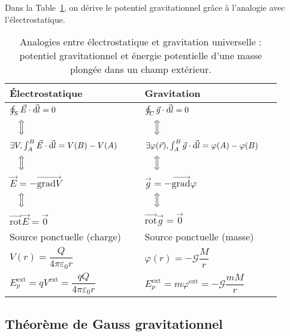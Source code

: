     Dans la Table~\ref{tab:analogie_gravitation_universelle_potentiel_gravitationnel}, on dérive le potentiel gravitationnel grâce à l'analogie avec l'électrostatique.
    \begin{table}
        \centering
        \begin{tabular}{p{0.45\linewidth}|p{0.45\linewidth}}
            \toprule
            Électrostatique & Gravitation \\ \midrule
            $\oint_{S}\vec{E}\cdot\vec{\mathrm{d} l}=0$ & $\oint_{C}\vec{g}\cdot\vec{\mathrm{d} l}=0$\\[0.25cm]
            $\quad\Big\Updownarrow$&$\quad\Big\Updownarrow$\\[0.25cm]
            $\exists V, \int_{A}^{B}\vec{E}\cdot\vec{\mathrm{d} l}=V(B)-V(A)$ & $\exists \varphi(\vec{r}),\int_{A}^{B}\vec{g}\cdot\vec{\mathrm{d} l}=\varphi(A)-\varphi(B)$\\[0.25cm]
            $\quad\Big\Updownarrow$&$\quad\Big\Updownarrow$\\[0.25cm]
            $\vec{E}=-\vec{\mathrm{grad}V}$ & $\vec{g}=-\vec{\mathrm{grad}}\varphi$\\[0.25cm]
            $\quad\Big\Updownarrow$&$\quad\Big\Updownarrow$\\[0.25cm]
            $\vec{\mathrm{rot}}\vec{E}=\vec{0}$ & $\vec{\mathrm{rot}}\vec{g}=\vec{0}$\\ \midrule
            Source ponctuelle (charge) & Source ponctuelle (masse)\\ \midrule
            $V(r)=\dfrac{Q}{4\pi\varepsilon_0 r}$ & $\varphi(r)=-\mathcal{G}\dfrac{M}{r}$\\ \midrule
            $E_{p}^{\text{ext}}=qV^{\text{ext}}=\dfrac{qQ}{4\pi\varepsilon_0 r}$ & $E_p^{\text{ext}}=m\varphi^{\text{ext}}=-\mathcal{G}\dfrac{mM}{r}$\\
            \bottomrule
        \end{tabular}    
        \caption{Analogies entre électrostatique et gravitation universelle : potentiel gravitationnel et énergie potentielle d'une masse plongée dans un champ extérieur.}
        \label{tab:analogie_gravitation_universelle_potentiel_gravitationnel}
    \end{table}

    \subsection{Théorème de Gauss gravitationnel}


